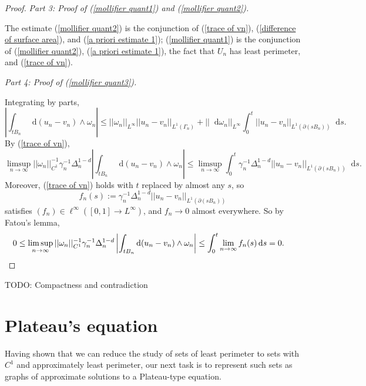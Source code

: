 \documentclass[reqno,10pt]{amsart}
\newcommand*\dif{\mathop{}\!\mathrm{d}}
\theoremstyle{definition}
\newcommand{\proofpart}[2]{%
  \par
  \addvspace{\medskipamount}%
  \noindent\emph{Part #1: #2.}
}
\numberwithin{equation}{section}
\begin{document}
\begin{proof}
\proofpart{3}{Proof of (\ref{mollifier quant1}) and (\ref{mollifier quant2})}
The estimate (\ref{mollifier quant2}) is the conjunction of (\ref{trace of vn}), (\ref{difference of surface area}), and (\ref{a priori estimate 1});
(\ref{mollifier quant1}) is the conjunction of (\ref{mollifier quant2}), (\ref{a priori estimate 1}), the fact that $U_n$ has least perimeter, and (\ref{trace of vn}).

\proofpart{4}{Proof of (\ref{mollifier quant3})}
Integrating by parts,
$$\left|\int_{tB_n} \dif (u_n - v_n) \wedge \omega_n\right| \leq ||\omega_n||_{L^\infty} ||u_n - v_n||_{L^1(\Gamma_n)} + ||\dif \omega_n||_{L^\infty} \int_0^t ||u_n - v_n||_{L^1(\partial(sB_n))} \dif s.$$
By (\ref{trace of vn}),
$$\limsup_{n \to \infty} ||\omega_n||_{C^1}^{-1} \gamma_n^{-1} \Delta_n^{1 - d} \left|\int_{tB_n} \dif(u_n - v_n) \wedge \omega_n\right| \leq \limsup_{n \to \infty} \int_0^t \gamma_n^{-1} \Delta_n^{1 - d} ||u_n - v_n||_{L^1(\partial(sB_n))} \dif s.$$
Moreover, (\ref{trace of vn}) holds with $t$ replaced by almost any $s$, so
$$f_n(s) := \gamma_n^{-1} \Delta_n^{1 - d} ||u_n - v_n||_{L^1(\partial(sB_n))}$$
satisfies $(f_n) \in \ell^\infty([0, 1] \to L^\infty)$, and $f_n \to 0$ almost everywhere.
So by Fatou's lemma,
\begin{align*}
0 \leq \limsup_{n \to \infty} ||\omega_n||_{C^1}^{-1} \gamma_n^{-1} \Delta_n^{1 - d} \left|\int_{tB_n} \dif(u_n - v_n) \wedge \omega_n\right| &\leq \int_0^t \lim_{n \to \infty} f_n(s) \dif s = 0. \qedhere
\end{align*}
\end{proof}

TODO: Compactness and contradiction


\section{Plateau's equation}\label{Plateau section}
Having shown that we can reduce the study of sets of least perimeter to sets with $C^1$ and approximately least perimeter, our next task is to represent such sets as graphs of approximate solutions to a Plateau-type equation.
\end{document}
